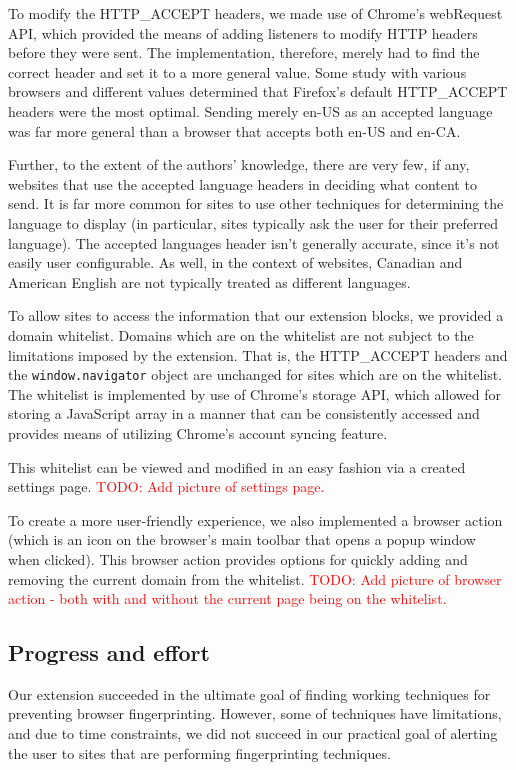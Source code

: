 \documentclass[12pt,a4paper]{article}
\begin{document}
To modify the HTTP\_ACCEPT headers, we made use of Chrome's webRequest API\cite{webrequest}, which provided the means of adding listeners to modify HTTP headers before they were sent. The implementation, therefore, merely had to find the correct header and set it to a more general value. Some study with various browsers and different values determined that Firefox's default HTTP\_ACCEPT headers were the most optimal. Sending merely en-US as an accepted language was far more general than a browser that accepts both en-US and en-CA.

Further, to the extent of the authors' knowledge, there are very few, if any, websites that use the accepted language headers in deciding what content to send. It is far more common for sites to use other techniques for determining the language to display (in particular, sites typically ask the user for their preferred language). The accepted languages header isn't generally accurate, since it's not easily user configurable. As well, in the context of websites, Canadian and American English are not typically treated as different languages.

To allow sites to access the information that our extension blocks, we provided a domain whitelist. Domains which are on the whitelist are not subject to the limitations imposed by the extension. That is, the HTTP\_ACCEPT headers and the \texttt{window.navigator} object are unchanged for sites which are on the whitelist. The whitelist is implemented by use of Chrome's storage API\cite{storage}, which allowed for storing a JavaScript array in a manner that can be consistently accessed and provides means of utilizing Chrome's account syncing feature.

This whitelist can be viewed and modified in an easy fashion via a created settings page. \textcolor{red}{TODO: Add picture of settings page.}

To create a more user-friendly experience, we also implemented a browser action (which is an icon on the browser's main toolbar that opens a popup window when clicked). This browser action provides options for quickly adding and removing the current domain from the whitelist. \textcolor{red}{TODO: Add picture of browser action - both with and without the current page being on the whitelist.}

\subsection{Progress and effort}
Our extension succeeded in the ultimate goal of finding working techniques for preventing browser fingerprinting. However, some of techniques have limitations, and due to time constraints, we did not succeed in our practical goal of alerting the user to sites that are performing fingerprinting techniques.
\end{document}
